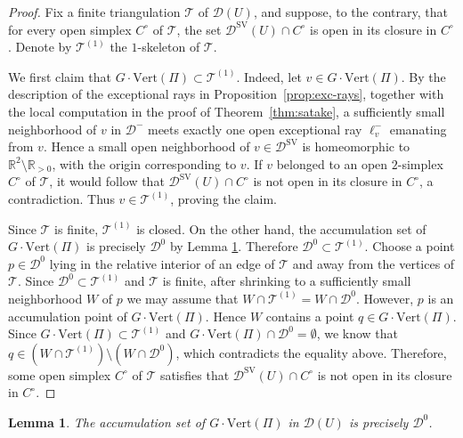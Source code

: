 \documentclass[reqno, 12pt]{amsart}
\newtheorem{lem}[prop]{Lemma}
\theoremstyle{definition}
\newcommand{\bR}{\mathbb{R}}
\newcommand{\cD}{\mathcal{D}}
\newcommand{\SV}{\mathrm{SV}}
\newcommand{\VPi}{\mathrm{Vert}(\Pi)}
\numberwithin{equation}{section}
\begin{document}
\begin{proof}
Fix a finite triangulation $\mathscr T$ of $\cD(U)$, and suppose, to the
contrary, that for every open simplex $C^\circ$ of $\mathscr T$, the set $\cD^{\SV}(U)\cap C^\circ$
is open in its closure in $C^\circ$. Denote by $\mathscr T^{(1)}$ the
$1$-skeleton of $\mathscr T$.

We first claim that $G\cdot\VPi\subset \mathscr T^{(1)}$.
Indeed, let $v\in G\cdot\VPi$. By the description of the exceptional
rays in Proposition~\ref{prop:exc-rays}, together with the local computation in the
proof of Theorem~\ref{thm:satake}, a sufficiently small neighborhood of $v$ in $\cD^-$ meets exactly one open exceptional ray $\ell_v^-$ emanating
from $v$. Hence a small open neighborhood of $v\in \cD^{\SV}$ is homeomorphic to
$\bR^2\setminus\bR_{>0}$, with the origin corresponding to $v$.
If $v$ belonged to an open $2$-simplex $C^\circ$ of $\mathscr T$, it
would follow that $\cD^{\SV}(U)\cap C^\circ$ is not open in its closure
in $C^\circ$, a contradiction. Thus $v\in\mathscr T^{(1)}$, proving the
claim.

Since $\mathscr T$ is finite, $\mathscr T^{(1)}$ is closed. On the other
hand, the accumulation set of $G\cdot\VPi$ is precisely
$\cD^0$ by Lemma \ref{lem:vertex-accumulation}.
Therefore $\cD^0\subset \mathscr T^{(1)}$.
Choose a point $p\in\cD^0$ lying in the relative interior of an edge of $\mathscr T$ and away from the vertices of $\mathscr T$. Since
$\cD^0\subset\mathscr T^{(1)}$ and $\mathscr T$ is finite, after shrinking to a sufficiently small neighborhood $W$ of $p$ we may assume
that
$W\cap\mathscr T^{(1)}=W\cap\cD^0$.
However, $p$ is an accumulation point of $G\cdot\VPi$. Hence $W$ contains a point $q\in G\cdot\VPi$. Since
$G\cdot\VPi\subset\mathscr T^{(1)}$ and $
G\cdot\VPi\cap\cD^0=\emptyset$, we know that $q \in (W\cap \mathscr{T}^{(1)})\setminus (W\cap \cD^0)$, which  contradicts the equality above.
Therefore, some open simplex $C^\circ$ of $\mathscr T$ satisfies that
$\cD^{\SV}(U)\cap C^\circ$ is not open in its closure in $C^\circ$.
\end{proof}

\begin{lem}\label{lem:vertex-accumulation}
The accumulation set of $G\cdot\VPi$ in $\cD(U)$ is precisely
$\cD^0$.
\end{lem}
\end{document}
